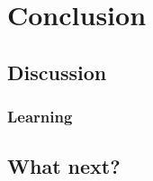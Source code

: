 \chapter{Conclusion}
\label{chapter|conclusion}

\section{Discussion}
\label{sect|discussion}

\subsection{Learning}
\label{sect|discussion-learning}

\section{What next?}
\label{sect|perspectives}


